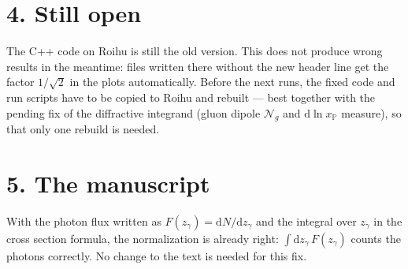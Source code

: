 \documentclass[12pt]{article}
\newcommand{\xpo}{x_{\mathbb{P}}}
\begin{document}
\section*{4. Still open}

The C++ code on Roihu is still the old version. This does not produce wrong results in the
meantime: files written there without the new header line get the factor $1/\sqrt2$ in the plots
automatically. Before the next runs, the fixed code and run scripts have to be copied to Roihu and
rebuilt --- best together with the pending fix of the diffractive integrand (gluon dipole
$\mathcal{N}_g$ and $\mathrm{d}\ln\xpo$ measure), so that only one rebuild is needed.

\section*{5. The manuscript}

With the photon flux written as $F(z_\gamma)=\mathrm{d}N/\mathrm{d}z_\gamma$ and the integral over
$z_\gamma$ in the cross section formula, the normalization is already right:
$\int\mathrm{d}z_\gamma\,F(z_\gamma)$ counts the photons correctly. No change to the text is needed for
this fix.
\end{document}
